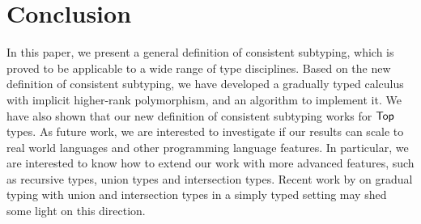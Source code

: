 
\section{Conclusion}
\label{sec:conclusion}

In this paper, we present a general definition of consistent subtyping, which is
proved to be applicable to a wide range of type disciplines. Based on the
new definition of consistent subtyping, we have developed a gradually typed
calculus with implicit higher-rank polymorphism, and an algorithm to implement
it. We have also shown that our new definition of consistent subtyping
works for $\mathsf{Top}$ types.
 As future work, we are interested to investigate if our results can scale to
real world languages and other programming language features. 
In particular, we are interested to know how to extend our work with more advanced
features, such as recursive types, union types and intersection types.
Recent work
by \citet{castagna2017gradual} on gradual typing with union and intersection
types in a simply typed setting may shed some light on this direction.


